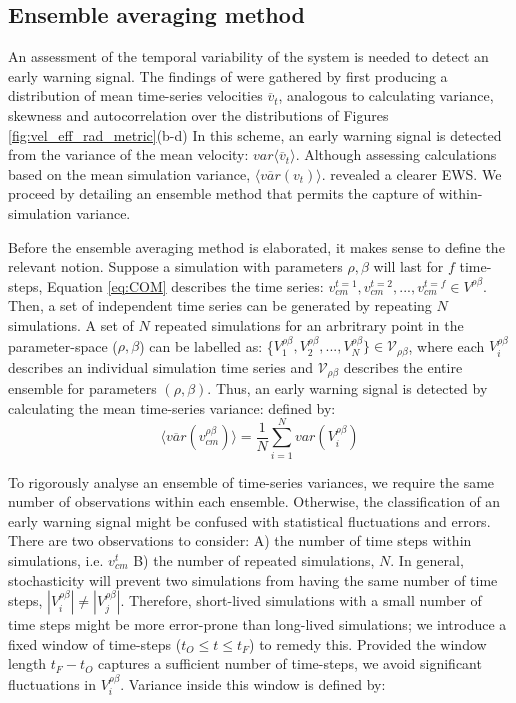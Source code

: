 \subsection{Ensemble averaging method}

An assessment of the temporal variability of the system is needed to detect an early warning signal. 
The findings of \cite{OROZCOFUENTES201912} were gathered by first producing a distribution of mean time-series velocities $\overline{v}_t$,
analogous to calculating variance, skewness and autocorrelation over the distributions of Figures \ref{fig:vel_eff_rad_metric}(b-d)
In this scheme, an early warning signal is detected from the variance of the mean velocity: $var\big\langle \overline{v}_t \big\rangle $.
Although assessing calculations based on the mean simulation variance, $ \big\langle \overline{var}({v}_t) \big\rangle $. revealed a clearer EWS.
We proceed by detailing an ensemble method that permits the capture of within-simulation variance. 

Before the ensemble averaging method is elaborated, it makes sense to define the relevant notion.
Suppose a simulation with parameters $\rho, \beta$ will last for $f$ time-steps, Equation \ref{eq:COM} describes the time series: $v_{cm}^{t=1}, v_{cm}^{t=2},..., v_{cm}^{t=f} \in V^{\rho\beta}$. 
Then, a set of independent time series can be generated by repeating $N$ simulations. 
A set of $N$ repeated simulations for an arbritrary point in the parameter-space ($\rho, \beta$) 
can be labelled as: \{$V_1^{\rho\beta}, V_2^{\rho \beta},..., V_N^{\rho\beta}\} \in \mathcal{V}_{\rho\beta}$, 
where each $V_i^{\rho\beta}$ describes an individual simulation time series and $\mathcal{V}_{\rho\beta}$ describes the entire ensemble for parameters $(\rho, \beta)$. 
Thus, an early warning signal is detected by calculating the mean time-series variance:
defined by:
\begin{equation}
\label{eq:ews_eq}
    \big\langle \overline{var}(v^{\rho\beta}_{cm}) \big\rangle = \frac{1}{N}\sum\limits_{i=1}^{N} var(V_i^{\rho\beta})
\end{equation}

To rigorously analyse an ensemble of time-series variances, 
we require the same number of observations within each ensemble. 
Otherwise, the classification of an early warning signal might be confused with statistical fluctuations and errors.
There are two observations to consider: 
A) the number of time steps within simulations, i.e. $v_{cm}^{t}$ 
B) the number of repeated simulations, $N$.
In general, stochasticity will prevent two simulations from having the same number of time steps, 
$|V_i^{\rho\beta}| \neq |V_j^{\rho\beta}|$.
Therefore, short-lived simulations with a small number of time steps might be more error-prone than long-lived simulations;
we introduce a fixed window of time-steps ($t_O\leq t \leq t_F$) to remedy this.
Provided the window length $t_F-t_O$ captures a sufficient number of time-steps, we avoid significant fluctuations in $V_i^{\rho\beta}$. 
Variance inside this window is defined by:


